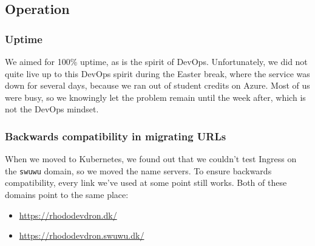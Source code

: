 \subsection{Operation}

\subsubsection{Uptime}

We aimed for 100\% uptime, as is the spirit of DevOps. Unfortunately, we did not quite live up to this DevOps spirit during the Easter break, where the service was down for several days, because we ran out of student credits on Azure. Most of us were busy, so we knowingly let the problem remain until the week after, which is not the DevOps mindset.


\subsubsection{Backwards compatibility in migrating URLs}

When we moved to Kubernetes, we found out that we couldn't test Ingress on the \texttt{swuwu} domain, so we moved the name servers. To ensure backwards compatibility, every link we've used at some point still works.
Both of these domains point to the same place:
\begin{itemize}
    \item \url{https://rhododevdron.dk/}
    \item \url{https://rhododevdron.swuwu.dk/}
\end{itemize}
